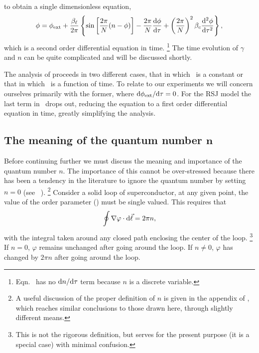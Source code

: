 to obtain a single dimensionless equation,
%
%
\begin{equation}
\label{eqn:ode}
\phi  = \phi_{\mathrm{ext}} + {\beta_\ell \over 2 \pi} \left\{
         \sin\left[{2 \pi \over N} (n - \phi)\right]
        - {2 \pi \over N} {\mathrm{d} \phi \over \mathrm{d} \tau} 
        + \left( {2 \pi \over N} \right)^2 \beta_c {\mathrm{d}^2 \phi \over \mathrm{d} \tau^2}
        \right\}
 \mathrm{,}
\end{equation}
%
%
which is a second order differential equation in time.%
\footnote{Eqn.~ has no $\mathrm{d} n /\mathrm{d} \tau$ 
term because $n$ is a 
discrete variable.} The time evolution of $\gamma$ and $n$ can be quite
complicated and will be discussed 
shortly. 

The analysis of 
 proceeds in two different cases, that in which \phiext\ is
a constant or that in which \phiext\ is a function of time. To relate
to our experiments we will concern ourselves primarily with
the former, where $\mathrm{d}\phi_{\mathrm{ext}} / \mathrm{d}\tau = 0$. 
For the RSJ model the last term in \ drops out,
reducing the equation to a first order differential equation
in time, greatly
simplifying the analysis. 

\subsection[The meaning of the quantum number $n$]
{The meaning of the quantum number $\mathbf{n}$}

Before continuing further we must discuss the meaning and 
importance of the quantum number $n$. The importance of this cannot
be over-stressed because there has been a tendency in the literature
to ignore the quantum number by setting $n=0$ 
(see \eg\ ).%
\footnote{A useful discussion of the proper definition of $n$ is given
in the appendix of ,
which reaches similar conclusions to those drawn here, through
slightly different means.}
Consider a solid loop of superconductor, 
at any given point, the value of the
order parameter (\cf{}) must be single valued.
This requires that 
%
\begin{equation}
\label{eqn:solidloopintegral}
\oint\nabla\varphi \cdot \mathrm{d}\vec\ell = 2\pi n ,
\end{equation}
%
with the 
integral taken around any closed path enclosing the center of the loop.%
\footnote{This is not the rigorous definition, but serves for the present
purpose (it is a special case) with minimal confusion.} 
If $n=0$, $\varphi$ remains unchanged after going around the loop.
If $n\ne 0$, $\varphi$ has changed by $2 \pi n$ after going around
the loop.

